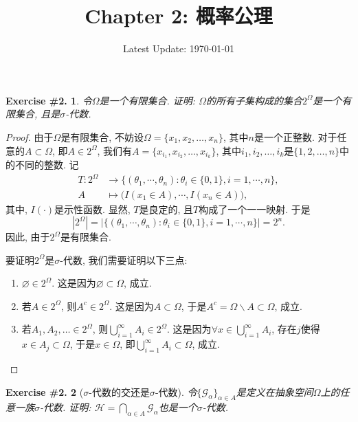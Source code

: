\documentclass[UTF8, a4paper]{article}
\title{Chapter 2: 概率公理}
\author{}
\date{Latest Update: \today}
\newtheorem{exercise}{Exercise \#2.}
\begin{document}
\maketitle
\begin{framed}
\begin{exercise}
    令\(\Omega\)是一个有限集合. 证明: \(\Omega\)的所有子集构成的集合\(2^{\Omega}\)是一个有限集合, 且是\(\sigma\)-代数.
\end{exercise}
\end{framed}


\begin{proof}
    由于\(\Omega\)是有限集合, 不妨设\(\Omega = \{x_{1}, x_{2}, \ldots, x_{n}\}\), 其中\(n\)是一个正整数. 对于任意的\(A \subset \Omega\), 即\(A \in 2^{\Omega}\), 我们有\(A = \{x_{i_{1}}, x_{i_{2}}, \ldots, x_{i_{k}}\}\), 其中\(i_{1}, i_{2}, \ldots, i_{k}\)是\(\{1, 2, \ldots, n\}\)中的不同的整数. 
    记
    $$
    \begin{aligned}
        T : 2^\Omega &\to \{(\theta_1, \cdots, \theta_n): \theta_i \in \{0,1\}, i = 1,\cdots,n\}, \\
        A& \mapsto \big(I(x_1 \in A), \cdots, I(x_n \in A) \big), 
    \end{aligned}
    $$
    其中, \(I(\cdot)\)是示性函数. 显然, \(T\)是良定的, 且\(T\)构成了一个一一映射. 于是
    $$
    |2^\Omega| = |\{(\theta_1, \cdots, \theta_n): \theta_i \in \{0,1\}, i = 1,\cdots,n\}| = 2^n.
    $$
    因此, 由于\(2^\Omega\)是有限集合.

    要证明\(2^{\Omega}\)是\(\sigma\)-代数, 我们需要证明以下三点:
    \begin{enumerate}
        \item \(\varnothing \in 2^{\Omega}\). 这是因为\(\varnothing \subset \Omega\), 成立.
        \item 若\(A \in 2^{\Omega}\), 则\(A^{c} \in 2^{\Omega}\). 这是因为\(A \subset \Omega\), 于是\(A^{c} = \Omega \backslash A \subset \Omega\), 成立.
        \item 若\(A_{1}, A_{2}, \ldots \in 2^{\Omega}\), 则\(\bigcup_{i=1}^{\infty} A_{i} \in 2^{\Omega}\). 这是因为\(\forall x \in \bigcup_{i=1}^{\infty} A_{i}\), 存在\(j\)使得\(x \in A_{j} \subset \Omega\), 于是\(x \in \Omega\), 即\(\bigcup_{i=1}^{\infty} A_{i} \subset \Omega\), 成立.
    \end{enumerate}
\end{proof}



\begin{framed}
\begin{exercise}[\(\sigma\)-代数的交还是\(\sigma\)-代数]
    令\(\{\mathcal{G}_\alpha\}_{\alpha \in A}\)是定义在抽象空间\(\Omega\)上的任意一族\(\sigma\)-代数. 证明: \(\mathcal{H} = \bigcap_{\alpha \in A} \mathcal{G}_\alpha\)也是一个\(\sigma\)-代数.
\end{exercise}
\end{framed}
\end{document}
